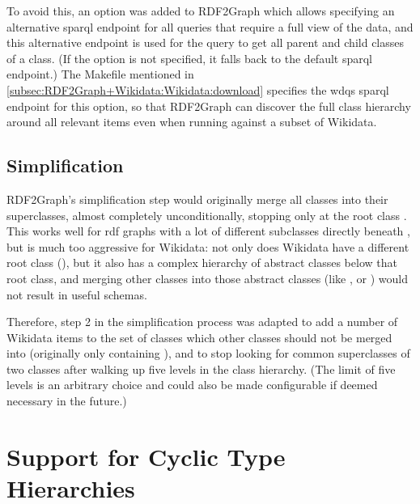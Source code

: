 To avoid this, an option was added to \gls{RDF2Graph}
which allows specifying an alternative \gls{sparql} endpoint
for all queries that require a full view of the data,
and this alternative endpoint is used for the query to get all parent and child classes of a class.
(If the option is not specified, it falls back to the default \gls{sparql} endpoint.)
The Makefile mentioned in \cref{subsec:RDF2Graph+Wikidata:Wikidata:download}
specifies the \gls{wdqs} \gls{sparql} endpoint for this option,
so that \gls{RDF2Graph} can discover the full class hierarchy around all relevant items
even when running against a subset of \gls{Wikidata}. %

\subsection{Simplification}
\label{subsec:RDF2Graph+Wikidata:Wikidata:simplification}

\Gls{RDF2Graph}’s simplification step would originally merge all classes into their superclasses,
almost completely unconditionally,
stopping only at the root class .
This works well for \gls{rdf} graphs with a lot of different subclasses directly beneath ,
but is much too aggressive for \gls{Wikidata}:
not only does \gls{Wikidata} have a different root class (),
but it also has a complex hierarchy of abstract classes below that root class,
and merging other classes into those abstract classes
(like ,  or )
would not result in useful \glspl{schema}.

Therefore, step 2 in the simplification process was adapted
to add a number of \gls{Wikidata} \glspl{item} to the set of classes
which other classes should not be merged into
(originally only containing ),
and to stop looking for common superclasses of two classes
after walking up five levels in the class hierarchy.
(The limit of five levels is an arbitrary choice
and could also be made configurable if deemed necessary in the future.) %

\section{Support for Cyclic Type Hierarchies}
\label{sec:RDF2Graph+Wikidata:cyclic-graphs}

